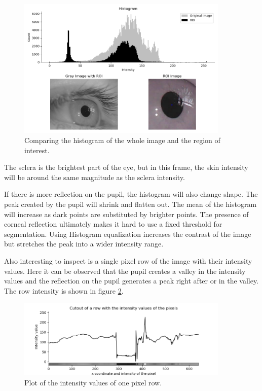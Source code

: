     \begin{figure}[ht]
      \centering
      \includegraphics[width=0.9\textwidth]{plots/histogram_with_roi.png}
      \caption{Comparing the histogram of the whole image and the region of interest.}
      \label{fig:hist1}
    \end{figure}

    The sclera is the brightest part of the eye, but in this frame, the skin intensity will be around the same magnitude as the sclera intensity. 

    If there is more reflection on the pupil, the histogram will also change shape. The peak created by the pupil will shrink and flatten out. The mean of the histogram will increase as dark points are substituted by brighter points. The presence of corneal reflection ultimately makes it hard to use a fixed threshold for segmentation. Using Histogram equalization increases the contrast of the image but stretches the peak into a wider intensity range. 

    Also interesting to inspect is a single pixel row of the image with their intensity values. Here it can be observed that the pupil creates a valley in the intensity values and the reflection on the pupil generates a peak right after or in the valley. The row intensity is shown in figure \ref{fig:row_intens}.
    \begin{figure}[ht]
      \centering
      \includegraphics[width=0.9\textwidth]{plots/row_intensity_valles.png}
      \caption{Plot of the intensity values of one pixel row.}
      \label{fig:row_intens}
    \end{figure}

